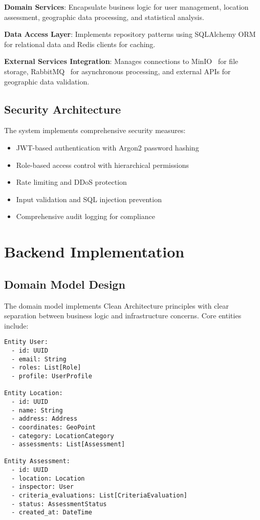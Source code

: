 \documentclass[a4paper,12pt,oneside]{book}
\begin{document}
\textbf{Domain Services}: Encapsulate business logic for user management, location assessment, geographic data processing, and statistical analysis.

\textbf{Data Access Layer}: Implements repository patterns using SQLAlchemy ORM for relational data and Redis clients for caching.

\textbf{External Services Integration}: Manages connections to MinIO~\cite{minio} for file storage, RabbitMQ~\cite{rabbitmq} for asynchronous processing, and external APIs for geographic data validation.

\section{Security Architecture}

The system implements comprehensive security measures:

\begin{itemize}
    \item JWT-based authentication with Argon2 password hashing
    \item Role-based access control with hierarchical permissions
    \item Rate limiting and DDoS protection
    \item Input validation and SQL injection prevention
    \item Comprehensive audit logging for compliance
\end{itemize}

\chapter{Backend Implementation}
\section{Domain Model Design}

The domain model implements Clean Architecture principles with clear separation between business logic and infrastructure concerns. Core entities include:

\begin{lstlisting}[language=Pseudocode, caption=Core Domain Entities Structure]
Entity User:
  - id: UUID
  - email: String
  - roles: List[Role]
  - profile: UserProfile
  
Entity Location:
  - id: UUID  
  - name: String
  - address: Address
  - coordinates: GeoPoint
  - category: LocationCategory
  - assessments: List[Assessment]
  
Entity Assessment:
  - id: UUID
  - location: Location
  - inspector: User  
  - criteria_evaluations: List[CriteriaEvaluation]
  - status: AssessmentStatus
  - created_at: DateTime
\end{lstlisting}
\end{document}
